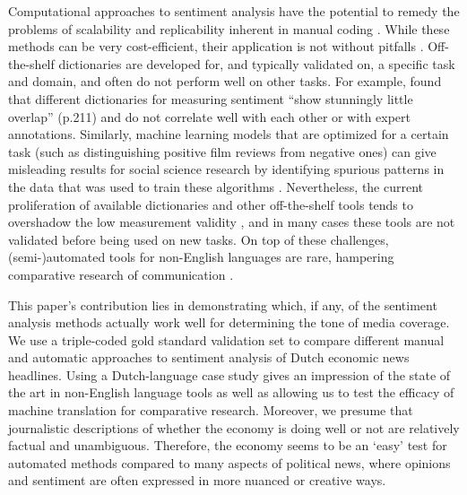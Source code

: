 Computational approaches to sentiment analysis have the potential to remedy the problems of scalability and replicability inherent in manual coding 
\citep[For overviews, see for example][]{vanatteveldt2019studying, welbers17, boumans16}.
While these methods can be very cost-efficient, their application is not without pitfalls \citep{grimmer13,wilkerson2017large,margolin2019computational,hilbert2019computational,atteveldt2018cmm}.
Off-the-shelf dictionaries are developed for, and typically validated on, a specific task and domain, and often do not perform well on other tasks. 
For example, \citet{young12} found that different dictionaries for measuring sentiment ``show stunningly little overlap'' (p.211)
and do not correlate well with each other or with expert annotations. 
Similarly, machine learning models that are optimized for a certain task (such as distinguishing positive film reviews from negative ones) can give misleading results for social science research by identifying spurious patterns in the data that was used to train these algorithms \citep{thelwall2012sentiment}.
Nevertheless, the current proliferation of available dictionaries and other off-the-shelf tools tends to overshadow the low measurement validity \citep{gonzalez15, soroka15},
and in many cases these tools are not validated before being used on new tasks. 
On top of these challenges, (semi-)automated tools for non-English languages are rare, hampering comparative research of communication \citep{haselmayer2017sentiment}. 

This paper's contribution lies in demonstrating which, if any, of the sentiment analysis methods actually work well for determining the tone of media coverage.
We use a triple-coded gold standard validation set to compare different manual and automatic approaches to sentiment analysis of Dutch economic news headlines.
Using a Dutch-language case study gives an impression of the state of the art in non-English language tools 
as well as allowing us to test the efficacy of machine translation for comparative research.
Moreover, we presume that journalistic descriptions of whether the economy is doing well or not are relatively factual and unambiguous. 
Therefore, the economy seems to be an `easy' test for automated methods compared to many aspects of political news,
where opinions and sentiment are often expressed in more nuanced or creative ways. 

